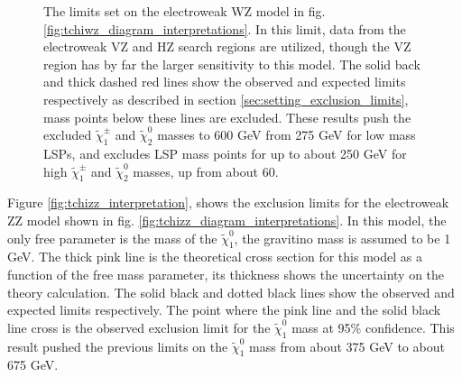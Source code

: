 \begin{figure}[!h]
{        The limits set on the electroweak WZ model in fig. \ref{fig:tchiwz_diagram_interpretations}. In this limit, data from the electroweak VZ and HZ search regions are utilized, though the VZ region has by far the larger sensitivity to this model. The solid back and thick dashed red lines show the observed and expected limits respectively as described in section \ref{sec:setting_exclusion_limits}, mass points below these lines are excluded. These results push the excluded $\widetilde{\chi}^{\pm}_1$ and $\widetilde{\chi}^0_2$ masses to 600 GeV from 275 GeV for low mass LSPs, and excludes LSP mass points for up to about 250 GeV for high $\widetilde{\chi}^{\pm}_1$ and $\widetilde{\chi}^0_2$ masses, up from about 60.
      }
    \end{figure}

    Figure \ref{fig:tchizz_interpretation}, shows the exclusion limits for the electroweak ZZ model shown in fig. \ref{fig:tchizz_diagram_interpretations}. In this model, the only free parameter is the mass of the $\widetilde{\chi}^0_1$, the gravitino mass is assumed to be 1 GeV. The thick pink line is the theoretical cross section for this model as a function of the free mass parameter, its thickness shows the uncertainty on the theory calculation. The solid black and dotted black lines show the observed and expected limits respectively. The point where the pink line and the solid black line cross is the observed exclusion limit for the $\widetilde{\chi}^0_1$ mass at 95\% confidence. This result pushed the previous limits on the $\widetilde{\chi}^0_1$ mass from about 375 GeV to about 675 GeV.


